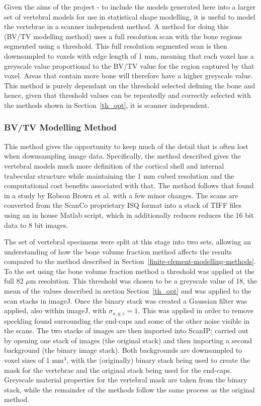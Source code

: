 Given the aims of the project - to include the models generated here into a
larger set of vertebral models for use in statistical shape modelling, it is
useful to model the vertebrae in a scanner independent method. A method for
doing this (BV/TV modelling method) uses a full resolution scan with the bone
regions segmented using a threshold. This full resolution segmented scan is then
downsampled to voxels with edge length of 1 mm, meaning that each voxel has a
greyscale value proportional to the BV/TV value for the region captured by that
voxel. Areas that contain more bone will therefore have a higher greyscale
value. This method is purely dependant on the threshold selected defining the
bone and hence, given that threshold values can be repeatedly and correctly
selected with the methods shown in Section~\ref{th_opt}, it is scanner independent.

\subsubsection{BV/TV Modelling Method}\label{bvtv_method}

This method gives the opportunity to keep much of the detail that is often lost when downsampling image data.
Specifically, the method described gives the vertebral models much more definition of the cortical shell and internal trabecular structure while maintaining the 1 mm cubed resolution and the computational cost benefits associated with that.
The method follows that found in a study by Robson Brown et al.
\cite{RobsonBrown2014} with a few minor changes. The scans are converted from the ScanCo proprietary ISQ format into a stack of TIFF files using an in house Matlab script, which in additionally reduces reduces the 16 bit data to 8 bit images.

The set of vertebral specimens were split at this stage into two sets, allowing
an understanding of how the bone volume fraction method affects the results compared to the method described in Section~\ref{finite-element-modelling-methods}.
To the set using the bone volume fraction method a threshold was applied at the full 82 $\mu$m resolution.
This threshold was chosen to be a greyscale value of 18, the mean of the values described in section Section~\ref{th_opt} and was applied to the scan stacks in imageJ.
Once the binary stack was created a Gaussian filter was applied, also within imageJ, with $
\sigma_{x,y,z} = 1 $.
This was applied in order to remove speckling found surrounding the end-caps and some of the other noise visible in the scans.
The two stacks of images are then imported into ScanIP; carried
out by opening one stack of images (the original stack) and then importing a
second background (the binary image stack). Both backgrounds are downsampled to
voxel sizes of 1 mm$^3$, with the (originally) binary stack being used to create
the mask for the vertebrae and the original stack being used for the end-caps.
Greyscale material properties for the vertebral mask are taken from the binary
stack, while the remainder of the methods follow the same process as the
original method.

